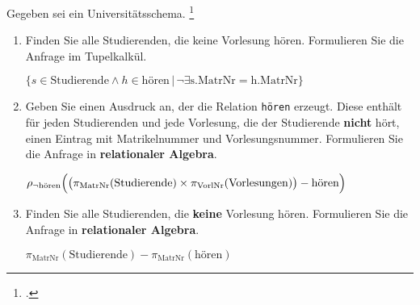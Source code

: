 \documentclass{bschlangaul-aufgabe}
\begin{document}

Gegeben sei ein Universitätsschema.
\footcite{examen:66116:2020:03}

\begin{enumerate}


\item Finden Sie alle Studierenden, die keine Vorlesung hören.
Formulieren Sie die Anfrage im Tupelkalkül.

\begin{bAntwort}
$\{ s \in \text{Studierende} \land h \in \text{hören} \, | \, \neg \exists \text{s.MatrNr} = \text{h.MatrNr} \}$
\end{bAntwort}


\item Geben Sie einen Ausdruck an, der die Relation \neg \texttt{hören}
erzeugt. Diese enthält für jeden Studierenden und jede Vorlesung, die
der Studierende \textbf{nicht} hört, einen Eintrag mit Matrikelnummer
und Vorlesungsnummer. Formulieren Sie die Anfrage in
\textbf{relationaler Algebra}.

\begin{bAntwort}
$\rho_{\neg \text{hören}} \Bigl(
\bigl(
  \pi_{\text{MatrNr}}(\text{Studierende})
  \times
  \pi_{\text{VorlNr}}(\text{Vorlesungen})
\bigr) - \text{hören}
\Bigr)
$
\end{bAntwort}


\item Finden Sie alle Studierenden, die \textbf{keine} Vorlesung hören.
Formulieren Sie die Anfrage in \textbf{relationaler Algebra}.

\begin{bAntwort}
$\pi_{\text{MatrNr}}(\text{Studierende}) - \pi_{\text{MatrNr}}(\text{hören})$
\end{bAntwort}
\end{enumerate}
\end{document}
